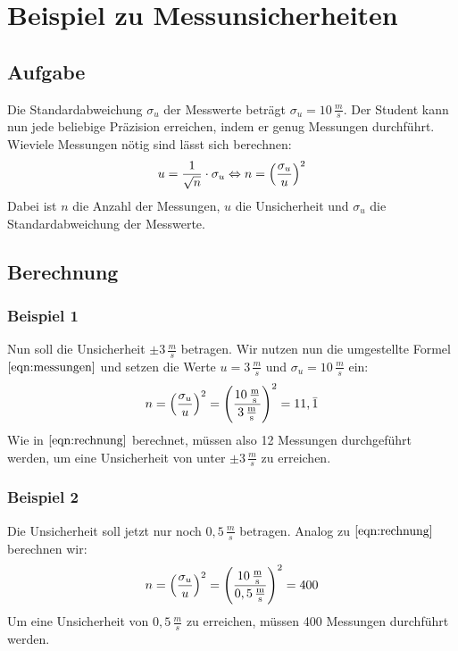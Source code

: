 \section{Beispiel zu Messunsicherheiten}
\label{sec:Durchführung}
\subsection{Aufgabe}
Die Standardabweichung $\sigma_u$ der Messwerte beträgt $\sigma_u = 10 \,\unit{\frac{m}{s}}$. Der Student kann nun jede beliebige Präzision erreichen, indem er genug Messungen durchführt.
Wieviele Messungen nötig sind lässt sich berechnen:
\begin{equation}
    u = \frac{1}{\sqrt{n}} \cdot \sigma_u \Leftrightarrow n = \Bigl(\frac{\sigma_u}{u}\Bigr)^2
    \label{eqn:messungen}
\end{equation}
Dabei ist $n$ die Anzahl der Messungen, $u$ die Unsicherheit und $\sigma_u$ die Standardabweichung der Messwerte.
\subsection{Berechnung}
\subsubsection{Beispiel 1}
Nun soll die Unsicherheit $\pm 3 \,\unit{\frac{m}{s}}$ betragen. Wir nutzen nun die umgestellte Formel $\eqref{eqn:messungen}$ und setzen die Werte $u = 3 \,\unit{\frac{m}{s}}$ und $\sigma_u = 10 \,\unit{\frac{m}{s}}$ ein:
\begin{equation}
    n = \Bigl(\frac{\sigma_u}{u}\Bigr)^2 = \Biggl(\frac{10 \,\unit{\frac{m}{s}}}{3 \,\unit{\frac{m}{s}}}\Biggr)^2 = 11,\bar{1}
    \label{eqn:rechnung}
\end{equation}
Wie in $\eqref{eqn:rechnung}$ berechnet, müssen also 12 Messungen durchgeführt werden, um eine Unsicherheit von unter $\pm 3 \,\unit{\frac{m}{s}}$ zu erreichen.
\subsubsection{Beispiel 2}
Die Unsicherheit soll jetzt nur noch $0,5 \,\unit{\frac{m}{s}}$ betragen.
Analog zu $\eqref{eqn:rechnung}$ berechnen wir:
\begin{equation}
    n = \Bigl(\frac{\sigma_u}{u}\Bigr)^2 = \Biggl(\frac{10 \,\unit{\frac{m}{s}}}{0,5 \,\unit{\frac{m}{s}}}\Biggr)^2 = 400
    \label{eqn:rechnung2}
\end{equation}
Um eine Unsicherheit von $0,5 \,\unit{\frac{m}{s}}$ zu erreichen, müssen 400 Messungen durchführt werden.